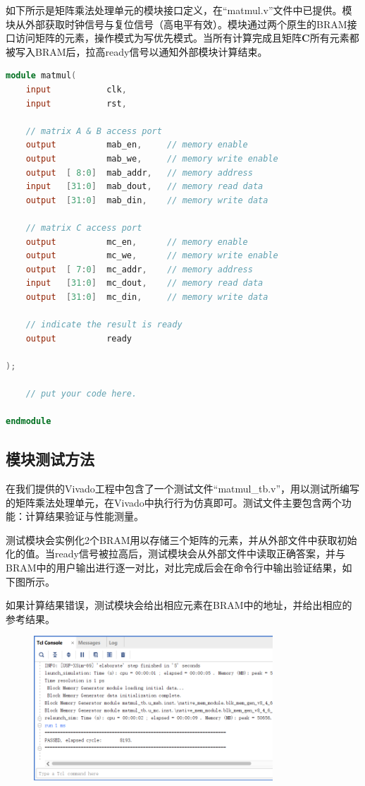 \documentclass{ctexart}
\begin{document}
如下所示是矩阵乘法处理单元的模块接口定义，在“matmul.v”文件中已提供。模块从外部获取时钟信号与复位信号（高电平有效）。模块通过两个原生的BRAM接口访问矩阵的元素，操作模式为写优先模式。当所有计算完成且矩阵$\boldsymbol{C}$所有元素都被写入BRAM后，拉高ready信号以通知外部模块计算结束。

\begin{lstlisting}[language=Verilog]
module matmul(
    input           clk,
    input           rst,
    
    // matrix A & B access port
    output          mab_en,     // memory enable
    output          mab_we,     // memory write enable
    output  [ 8:0]  mab_addr,   // memory address
    input   [31:0]  mab_dout,   // memory read data
    output  [31:0]  mab_din,    // memory write data

    // matrix C access port
    output          mc_en,      // memory enable
    output          mc_we,      // memory write enable
    output  [ 7:0]  mc_addr,    // memory address
    input   [31:0]  mc_dout,    // memory read data
    output  [31:0]  mc_din,     // memory write data

    // indicate the result is ready
    output          ready

);

    // put your code here.

endmodule
\end{lstlisting}

\subsection{模块测试方法}

在我们提供的Vivado工程中包含了一个测试文件“matmul\_tb.v”，用以测试所编写的矩阵乘法处理单元，在Vivado中执行行为仿真即可。测试文件主要包含两个功能：计算结果验证与性能测量。

测试模块会实例化2个BRAM用以存储三个矩阵的元素，并从外部文件中获取初始化的值。当ready信号被拉高后，测试模块会从外部文件中读取正确答案，并与BRAM中的用户输出进行逐一对比，对比完成后会在命令行中输出验证结果，如下图所示。

如果计算结果错误，测试模块会给出相应元素在BRAM中的地址，并给出相应的参考结果。

\begin{figure}[H]
    \centering
    \includegraphics[width=0.8\textwidth]{lab4/13.png}
\end{figure}
\end{document}
